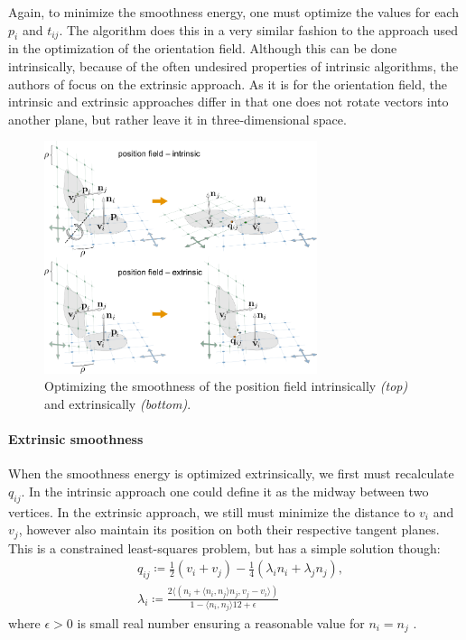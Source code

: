 \documentclass{ACGSeminar}
\begin{document}
Again, to minimize the smoothness energy, one must optimize the values for each $p_i$ and $t_{ij}$. The algorithm does this in a very similar fashion to the approach used in the optimization of the orientation field. Although this can be done intrinsically, because of the often undesired properties of intrinsic algorithms, the authors of \cite{jakob2015instant} focus on the extrinsic approach. As it is for the orientation field, the intrinsic and extrinsic approaches differ in that one does not rotate vectors into another plane, but rather leave it in three-dimensional space.

\begin{figure}[htb!]
	\begin{centering}
		\includegraphics[width=8cm]{img/position-field-intrinsic-extrinsic.png}\par
	\end{centering}
	\caption{Optimizing the smoothness of the position field intrinsically \textit{(top)} and extrinsically \textit{(bottom)}. \cite{jakob2015instant}}
	\label{fig:position-field-intrinsic-extrinsic}
\end{figure}

\paragraph{Extrinsic smoothness}
When the smoothness energy is optimized extrinsically, we first must recalculate $q_{ij}$. In the intrinsic approach one could define it as the midway between two vertices. In the extrinsic approach, we still must minimize the distance to $v_i$ and $v_j$, however also maintain its position on both their respective tangent planes. This is a constrained least-squares problem, but has a simple solution though:
\begin{equation*}
\begin{split}
	& q_{ij} \coloneqq \frac{1}{2}(v_i + v_j) - \frac{1}{4}(\lambda_i n_i + \lambda_j n_j),\\
	& \lambda_i \coloneqq \frac{2 \langle (n_i + \langle n_i, n_j \rangle n_j, v_j - v_i \rangle)}{1 - \langle n_i, n_j \rangle 12 + \epsilon}
\end{split}
\end{equation*}
where $\epsilon > 0$ is small real number ensuring a reasonable value for $n_i = n_j$ \cite{jakob2015instant}.\bigskip
\end{document}
